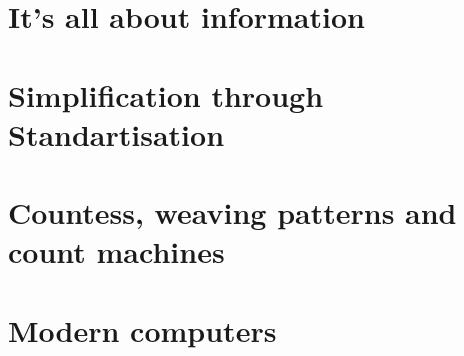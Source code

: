 \documentclass[../../../programming-introduction.tex]{subfiles}
\begin{document}
    \section{It's all about information}\label{section:its-all-about-information}
        
        \newpage
    \section{Simplification through Standartisation}\label{section:simplification-through-standartisation}
        
        \newpage
    \section{Countess, weaving patterns and count machines}\label{section:countess-weaving-patterns-and-count-machines}
        
        \newpage
    \section{Modern computers}\label{section:modern-computers}
        
        \newpage
\end{document}
